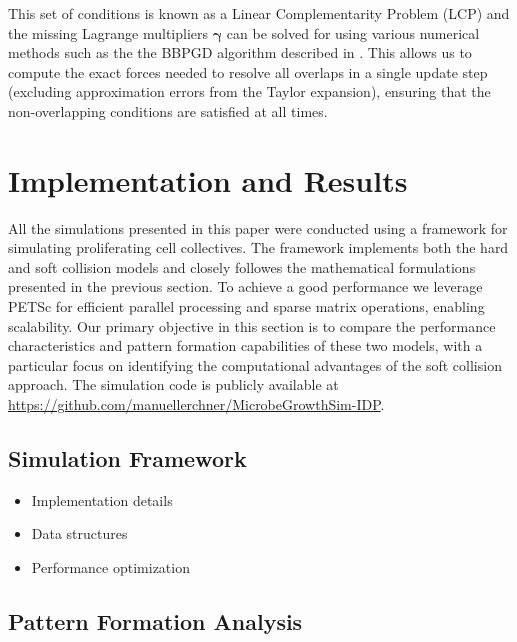 \documentclass[conference]{IEEEtran}
\begin{document}
This set of conditions is known as a Linear Complementarity Problem (LCP) and the missing Lagrange multipliers $\mathbf{\gamma}$ can be solved for using various numerical methods such as the the BBPGD algorithm described in \cite{Weady2024}. This allows us to compute the exact forces needed to resolve all overlaps in a single update step (excluding approximation errors from the Taylor expansion), ensuring that the non-overlapping conditions are satisfied at all times.




\newpage

\section{Implementation and Results}

All the simulations presented in this paper were conducted using a framework for simulating proliferating cell collectives. The framework implements both the hard and soft collision models and closely followes the mathematical formulations presented in the previous section. To achieve a good performance we leverage PETSc \cite{petsc-web-page} for efficient parallel processing and sparse matrix operations, enabling scalability. Our primary objective in this section is to compare the performance characteristics and pattern formation capabilities of these two models, with a particular focus on identifying the computational advantages of the soft collision approach. The simulation code is publicly available at {\color{blue}\url{https://github.com/manuellerchner/MicrobeGrowthSim-IDP}}.








\subsection{Simulation Framework}
\begin{itemize}
    \item Implementation details
    \item Data structures
    \item Performance optimization
\end{itemize}

\newpage

\subsection{Pattern Formation Analysis}
\end{document}
